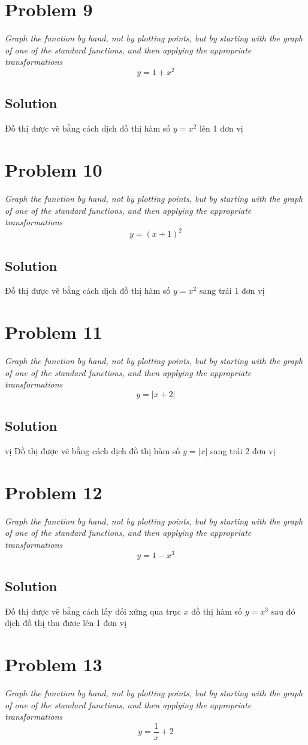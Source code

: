 \documentclass[11pt]{article}
\newcommand{\soln}{\subsection*}
\newcommand{\qn}{\textit}
\begin{document}
\section*{Problem 9}

\qn{Graph the function by hand, not by plotting points, but by starting with the graph of one of the standard functions, and then applying the appropriate transformations $$y=1+x^2$$}

\soln{Solution}
Đồ thị được vẽ bằng cách dịch đồ thị hàm số $y=x^2$ lên 1 đơn vị

\section*{Problem 10}

\qn{Graph the function by hand, not by plotting points, but by starting with the graph of one of the standard functions, and then applying the appropriate transformations $$y=(x+1)^2$$}

\soln{Solution}
Đồ thị được vẽ bằng cách dịch đồ thị hàm số $y=x^2$ sang trái 1 đơn vị

\section*{Problem 11}

\qn{Graph the function by hand, not by plotting points, but by starting with the graph of one of the standard functions, and then applying the appropriate transformations $$y=|x+2|$$}

\soln{Solution}vị
Đồ thị được vẽ bằng cách dịch đồ thị hàm số $y=|x|$ sang trái 2 đơn vị

\section*{Problem 12}

\qn{Graph the function by hand, not by plotting points, but by starting with the graph of one of the standard functions, and then applying the appropriate transformations $$y=1-x^3$$}

\soln{Solution}
Đồ thị được vẽ bằng cách lấy đối xứng qua trục $x$ đồ thị hàm số $y=x^3$ sau đó dịch đồ thị thu được lên 1 đơn vị

\section*{Problem 13}

\qn{Graph the function by hand, not by plotting points, but by starting with the graph of one of the standard functions, and then applying the appropriate transformations $$y=\frac{1}{x}+2$$}
\end{document}
